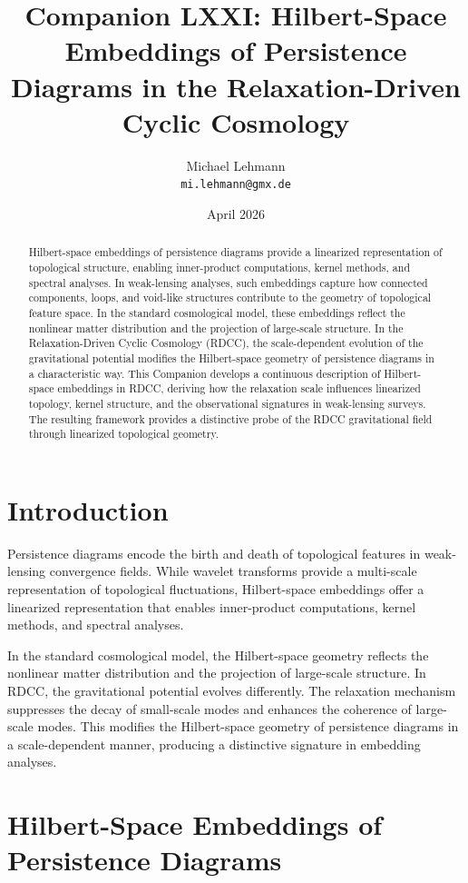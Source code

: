 \documentclass[11pt,a4paper]{article}
\title{\textbf{Companion LXXI: Hilbert-Space Embeddings of Persistence Diagrams in the Relaxation-Driven Cyclic Cosmology}}
\author{Michael Lehmann \\ \texttt{mi.lehmann@gmx.de}}
\date{April 2026}
\begin{document}
\maketitle

\begin{abstract}
Hilbert-space embeddings of persistence diagrams provide a linearized 
representation of topological structure, enabling inner-product computations, 
kernel methods, and spectral analyses. In weak-lensing analyses, such embeddings 
capture how connected components, loops, and void-like structures contribute to 
the geometry of topological feature space. In the standard cosmological model, 
these embeddings reflect the nonlinear matter distribution and the projection of 
large-scale structure. In the Relaxation-Driven Cyclic Cosmology (RDCC), the 
scale-dependent evolution of the gravitational potential modifies the Hilbert-space 
geometry of persistence diagrams in a characteristic way. This Companion develops 
a continuous description of Hilbert-space embeddings in RDCC, deriving how the 
relaxation scale influences linearized topology, kernel structure, and the 
observational signatures in weak-lensing surveys. The resulting framework provides 
a distinctive probe of the RDCC gravitational field through linearized topological 
geometry.
\end{abstract}
\section{Introduction}

Persistence diagrams encode the birth and death of topological features in 
weak-lensing convergence fields. While wavelet transforms provide a multi-scale 
representation of topological fluctuations, Hilbert-space embeddings offer a 
linearized representation that enables inner-product computations, kernel methods, 
and spectral analyses.

In the standard cosmological model, the Hilbert-space geometry reflects the 
nonlinear matter distribution and the projection of large-scale structure. In 
RDCC, the gravitational potential evolves differently. The relaxation mechanism 
suppresses the decay of small-scale modes and enhances the coherence of large-scale 
modes. This modifies the Hilbert-space geometry of persistence diagrams in a 
scale-dependent manner, producing a distinctive signature in embedding analyses.
\section{Hilbert-Space Embeddings of Persistence Diagrams}
\end{document}
